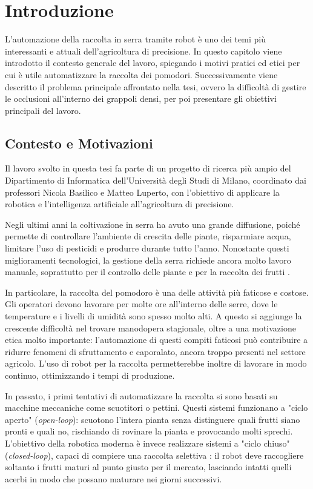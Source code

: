 \chapter{Introduzione}
\label{chap:introduzione}

L'automazione della raccolta in serra tramite robot è uno dei temi più interessanti 
e attuali dell'agricoltura di precisione. In questo capitolo viene introdotto il contesto 
generale del lavoro, spiegando i motivi pratici ed etici per cui è utile automatizzare 
la raccolta dei pomodori. Successivamente viene descritto il problema principale 
affrontato nella tesi, ovvero la difficoltà di gestire le occlusioni all'interno dei 
grappoli densi, per poi presentare gli obiettivi principali del lavoro.


\section{Contesto e Motivazioni}
\label{sec:contesto_motivazioni}

Il lavoro svolto in questa tesi fa parte di un progetto di ricerca più ampio del 
Dipartimento di Informatica dell'Università degli Studi di Milano, coordinato dai 
professori Nicola Basilico e Matteo Luperto, con l'obiettivo di applicare la robotica 
e l'intelligenza artificiale all'agricoltura di precisione.

Negli ultimi anni la coltivazione in serra ha avuto una grande diffusione, poiché permette 
di controllare l'ambiente di crescita delle piante, risparmiare acqua, limitare l'uso di 
pesticidi e produrre durante tutto l'anno. Nonostante questi miglioramenti tecnologici, 
la gestione della serra richiede ancora molto lavoro manuale, soprattutto per il 
controllo delle piante e per la raccolta dei frutti \cite{gongal2015sensors}.

In particolare, la raccolta del pomodoro è una delle attività più faticose e costose. 
Gli operatori devono lavorare per molte ore all'interno delle serre, dove le temperature 
e i livelli di umidità sono spesso molto alti. A questo si aggiunge la crescente difficoltà 
nel trovare manodopera stagionale, oltre a una motivazione etica molto importante: 
l'automazione di questi compiti faticosi può contribuire a ridurre fenomeni di sfruttamento 
e caporalato, ancora troppo presenti nel settore agricolo. L'uso di robot per la raccolta 
permetterebbe inoltre di lavorare in modo continuo, ottimizzando i tempi di produzione.

In passato, i primi tentativi di automatizzare la raccolta si sono basati su macchine 
meccaniche come scuotitori o pettini. Questi sistemi funzionano a "ciclo aperto" 
(\textit{open-loop}): scuotono l'intera pianta senza distinguere quali frutti siano pronti 
e quali no, rischiando di rovinare la pianta e provocando molti sprechi. L'obiettivo della 
robotica moderna è invece realizzare sistemi a "ciclo chiuso" (\textit{closed-loop}), 
capaci di compiere una raccolta selettiva \cite{silwal2017design}: il robot deve raccogliere 
soltanto i frutti maturi al punto giusto per il mercato, lasciando intatti quelli acerbi 
in modo che possano maturare nei giorni successivi.

